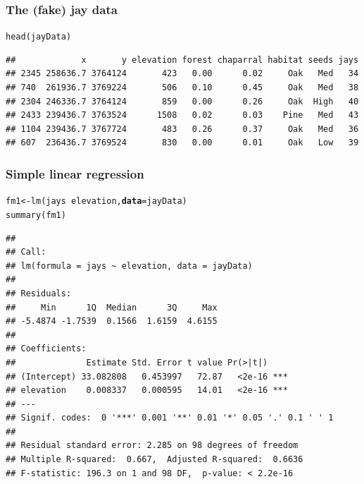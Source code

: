 \documentclass[color=usenames,dvipsnames]{beamer}\usepackage[]{graphicx}\usepackage[]{color}
\makeatletter
\newcommand{\hlopt}[1]{\textcolor[rgb]{0,0,0}{#1}}%
\newcommand{\hlstd}[1]{\textcolor[rgb]{0,0,0}{#1}}%
\newcommand{\hlkwb}[1]{\textcolor[rgb]{0,0.341,0.682}{#1}}%
\newcommand{\hlkwc}[1]{\textcolor[rgb]{0,0,0}{\textbf{#1}}}%
\newcommand{\hlkwd}[1]{\textcolor[rgb]{0.004,0.004,0.506}{#1}}%
\newenvironment{kframe}{%
 \def\at@end@of@kframe{}%
 \ifinner\ifhmode%
  \def\at@end@of@kframe{\end{minipage}}%
  \begin{minipage}{\columnwidth}%
 \fi\fi%
 \def\FrameCommand##1{\hskip\@totalleftmargin \hskip-\fboxsep
 \colorbox{shadecolor}{##1}\hskip-\fboxsep
     \hskip-\linewidth \hskip-\@totalleftmargin \hskip\columnwidth}%
 \MakeFramed {\advance\hsize-\width
   \@totalleftmargin\z@ \linewidth\hsize
   \@setminipage}}%
 {\par\unskip\endMakeFramed%
 \at@end@of@kframe}
\newenvironment{knitrout}{}{} %
\makeatother
\begin{document}
\begin{frame}[fragile]
  \frametitle{The (fake) jay data}
\begin{knitrout}\scriptsize
{}\color{fgcolor}\begin{kframe}
\begin{alltt}
\hlkwd{head}\hlstd{(jayData)}
\end{alltt}
\begin{verbatim}
##             x       y elevation forest chaparral habitat seeds jays
## 2345 258636.7 3764124       423   0.00      0.02     Oak   Med   34
## 740  261936.7 3769224       506   0.10      0.45     Oak   Med   38
## 2304 246336.7 3764124       859   0.00      0.26     Oak  High   40
## 2433 239436.7 3763524      1508   0.02      0.03    Pine   Med   43
## 1104 239436.7 3767724       483   0.26      0.37     Oak   Med   36
## 607  236436.7 3769524       830   0.00      0.01     Oak   Low   39
\end{verbatim}
\end{kframe}
\end{knitrout}
\end{frame}




\begin{frame}[fragile]
  \frametitle{Simple linear regression}
\begin{knitrout}\scriptsize
{}\color{fgcolor}\begin{kframe}
\begin{alltt}
\hlstd{fm1} \hlkwb{<-} \hlkwd{lm}\hlstd{(jays} \hlopt{~} \hlstd{elevation,} \hlkwc{data}\hlstd{=jayData)}
\hlkwd{summary}\hlstd{(fm1)}
\end{alltt}
\begin{verbatim}
## 
## Call:
## lm(formula = jays ~ elevation, data = jayData)
## 
## Residuals:
##     Min      1Q  Median      3Q     Max 
## -5.4874 -1.7539  0.1566  1.6159  4.6155 
## 
## Coefficients:
##              Estimate Std. Error t value Pr(>|t|)    
## (Intercept) 33.082808   0.453997   72.87   <2e-16 ***
## elevation    0.008337   0.000595   14.01   <2e-16 ***
## ---
## Signif. codes:  0 '***' 0.001 '**' 0.01 '*' 0.05 '.' 0.1 ' ' 1
## 
## Residual standard error: 2.285 on 98 degrees of freedom
## Multiple R-squared:  0.667,	Adjusted R-squared:  0.6636 
## F-statistic: 196.3 on 1 and 98 DF,  p-value: < 2.2e-16
\end{verbatim}
\end{kframe}
\end{knitrout}
\end{frame}
\end{document}
